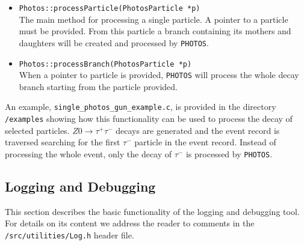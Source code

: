 \documentclass[]{Photos_interface_design}
\begin{document}
\begin{itemize}
  \item {\tt Photos::processParticle(PhotosParticle *p) } \hfill \\
		The main method for processing a single particle. A pointer to a particle must
		be provided. From this particle a branch containing its mothers and daughters
		will be created and processed by {\tt PHOTOS}.
  \item {\tt Photos::processBranch(PhotosParticle *p) } \hfill \\
 		When a pointer to particle is provided, {\tt PHOTOS} will process the whole decay
		branch starting from the particle provided.
\end{itemize}

An example, {\tt single\_photos\_gun\_example.c}, is provided in the directory {\tt /examples}
showing how this functionality can be used to process the decay of selected particles.
$Z0 \rightarrow \tau^+ \tau^-$ decays are generated and the event record is traversed
searching for the first $\tau^-$ particle in the event record.
Instead of processing the whole event, only the decay of $\tau^-$ is processed by {\tt PHOTOS}.


\subsection{Logging and Debugging}
\label{App:Logging}
This section describes the basic functionality of the logging and debugging tool.
For details on its content we address the reader to comments in the {\tt /src/utilities/Log.h} header file.
\end{document}
